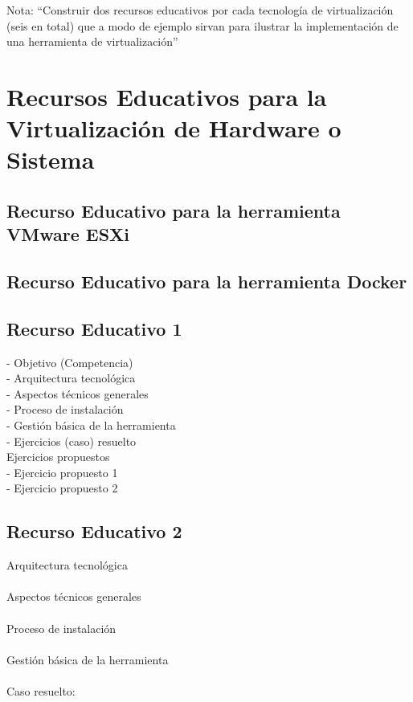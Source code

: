 Nota: ``Construir dos recursos educativos por cada tecnología de virtualización (seis en total) que a modo de ejemplo sirvan para ilustrar la implementación de una herramienta de virtualización'' 

\section{Recursos Educativos para la Virtualización de Hardware o Sistema}

\subsection{Recurso Educativo para la herramienta VMware ESXi}



\newpage

\subsection{Recurso Educativo para la herramienta Docker}




\subsection{Recurso Educativo 1}

- Objetivo (Competencia)\\

- Arquitectura tecnológica\\

- Aspectos técnicos generales\\

- Proceso de instalación\\

- Gestión básica de la herramienta\\

- Ejercicios (caso) resuelto\\

Ejercicios propuestos\\
- Ejercicio propuesto 1\\
- Ejercicio propuesto 2\\



\subsection{Recurso Educativo 2}
Arquitectura tecnológica
\\\\
Aspectos técnicos generales
\\\\
Proceso de instalación
\\\\
Gestión básica de la herramienta
\\\\
Caso resuelto: 
\\\\

